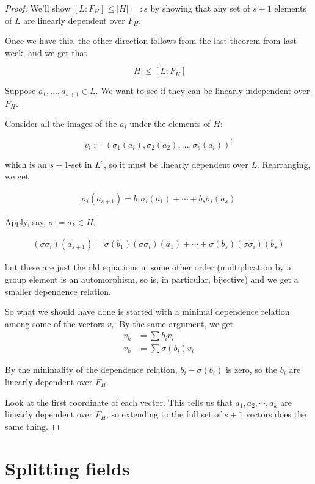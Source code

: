 \documentclass{article}
\theoremstyle{definition}
\begin{document}
\begin{proof}
 We'll show $[L:F_H] \leq |H| =: s$ by showing that any set of $s+1$ elements of
 $L$ are linearly dependent over $F_H$.

 Once we have this, the other direction follows from the last theorem from last
 week, and we get that

 $$|H| \leq [L:F_H]$$

 Suppose $a_1,\ldots,a_{s+1}\in L$. We want to see if they can be linearly
 independent over $F_H$.

 Consider all the images of the $a_i$ under the elements of $H$:

 $$v_i := (\sigma_1(a_i),\sigma_2(a_2),\ldots,\sigma_s(a_i))^t$$

 which is an $s+1$-set in $L^s$, so it must be linearly dependent over $L$.
 Rearranging, we get

 \begin{align}
  \sigma_i(a_{s+1}) = b_1\sigma_i(a_1) + \cdots + b_s\sigma_i(a_s) 
 \end{align}

 Apply, say, $\sigma := \sigma_k \in H$.

 \begin{align}
   (\sigma \sigma_i)(a_{s+1}) = \sigma(b_1)(\sigma \sigma_i)(a_1)+\cdots+\sigma(b_s)(\sigma\sigma_i)(b_s)
 \end{align}

 but these are just the old equations in some other order (multiplication by a
 group element is an automorphism, so is, in particular, bijective) and we get a
 smaller dependence relation.

So what we should have done is started with a minimal dependence relation among
some of the vectors $v_i$. By the same argument, we get
\begin{align}
  v_k &= \sum b_iv_i \\
  v_k &= \sum \sigma(b_i)v_i
\end{align}

By the minimality of the dependence relation, $b_i - \sigma(b_i)$ is zero, so
the $b_i$ are linearly dependent over $F_H$.

Look at the first coordinate of each vector. This tells us that
$a_1,a_2,\cdots,a_k$ are linearly dependent over $F_H$, so extending to the full
set of $s+1$ vectors does the same thing.
\end{proof}

\section{Splitting fields}
\end{document}
